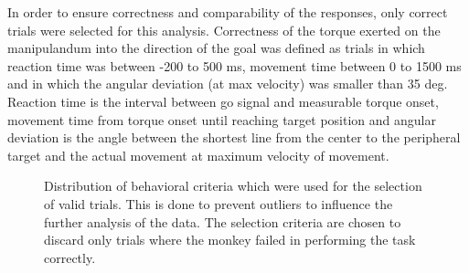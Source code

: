In order to ensure correctness and comparability of the responses, only correct trials were selected for this analysis. Correctness of the torque exerted on the manipulandum into the direction of the goal was defined as trials in which reaction time was between -200 to 500 ms, movement time between 0 to 1500 ms and in which the angular deviation (at max velocity) was smaller than 35 deg. Reaction time is the interval between go signal and measurable torque onset, movement time from torque onset until reaching target position and angular deviation is the angle between the shortest line from the center to the peripheral target and the actual movement at maximum velocity of movement.
\begin{figure}[ht]
    \centering
    \caption{Distribution of behavioral criteria which were used for the selection of valid trials. This is done to prevent outliers to influence the further analysis of the data. The selection criteria are chosen to discard only trials where the monkey failed in performing the task correctly.}
    \label{sg:fig:images_behav_crit}
\end{figure}
